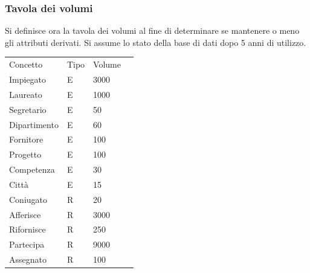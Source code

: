 \documentclass{article}
\begin{document}
\subsubsection{Tavola dei volumi}
Si definisce ora la tavola dei volumi al fine di determinare se mantenere o meno gli attributi derivati.
\newline
Si assume lo stato della base di dati dopo 5 anni di utilizzo.
\begin{table}[H]
\renewcommand{\arraystretch}{1.1}
\centering
\begin{tabular}{|p{}|l|l|l|}
\cline{1-3}
Concetto & Tipo & Volume \\ \cline{1-3}
Impiegato & E & 3000 \\ \cline{1-3}
Laureato & E & 1000 \\ \cline{1-3}
Segretario & E & 50 \\ \cline{1-3}
Dipartimento & E & 60 \\ \cline{1-3}
Fornitore & E & 100 \\ \cline{1-3}
Progetto & E & 100 \\ \cline{1-3}
Competenza & E & 30 \\ \cline{1-3}
Città & E & 15 \\ \cline{1-3}
Coniugato & R & 20 \\ \cline{1-3}
Afferisce & R & 3000 \\ \cline{1-3}
Rifornisce & R & 250 \\ \cline{1-3}
Partecipa & R & 9000 \\ \cline{1-3}
Assegnato & R & 100 \\ \cline{1-3}
\end{tabular}
\end{table}

\newpage
\end{document}
